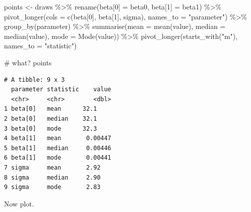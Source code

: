 \documentclass[
  letterpaper,
  DIV=11,
  numbers=noendperiod]{scrartcl}
\newenvironment{Shaded}{\begin{snugshade}}{\end{snugshade}}
\newcommand{\AttributeTok}[1]{\textcolor[rgb]{0.40,0.45,0.13}{#1}}
\newcommand{\CommentTok}[1]{\textcolor[rgb]{0.37,0.37,0.37}{#1}}
\newcommand{\FunctionTok}[1]{\textcolor[rgb]{0.28,0.35,0.67}{#1}}
\newcommand{\NormalTok}[1]{\textcolor[rgb]{0.00,0.23,0.31}{#1}}
\newcommand{\OtherTok}[1]{\textcolor[rgb]{0.00,0.23,0.31}{#1}}
\newcommand{\SpecialCharTok}[1]{\textcolor[rgb]{0.37,0.37,0.37}{#1}}
\newcommand{\StringTok}[1]{\textcolor[rgb]{0.13,0.47,0.30}{#1}}
\begin{document}
\begin{Shaded}
\begin{Highlighting}[]
\NormalTok{points }\OtherTok{\textless{}{-}}\NormalTok{ draws }\SpecialCharTok{\%\textgreater{}\%} 
  \FunctionTok{rename}\NormalTok{(}\StringTok{\textasciigrave{}}\AttributeTok{beta[0]}\StringTok{\textasciigrave{}} \OtherTok{=}\NormalTok{ beta0,}
         \StringTok{\textasciigrave{}}\AttributeTok{beta[1]}\StringTok{\textasciigrave{}} \OtherTok{=}\NormalTok{ beta1) }\SpecialCharTok{\%\textgreater{}\%} 
  \FunctionTok{pivot\_longer}\NormalTok{(}\AttributeTok{cols =} \FunctionTok{c}\NormalTok{(}\StringTok{\textasciigrave{}}\AttributeTok{beta[0]}\StringTok{\textasciigrave{}}\NormalTok{, }\StringTok{\textasciigrave{}}\AttributeTok{beta[1]}\StringTok{\textasciigrave{}}\NormalTok{, sigma), }
               \AttributeTok{names\_to =} \StringTok{"parameter"}\NormalTok{) }\SpecialCharTok{\%\textgreater{}\%} 
  \FunctionTok{group\_by}\NormalTok{(parameter) }\SpecialCharTok{\%\textgreater{}\%} 
  \FunctionTok{summarise}\NormalTok{(}\AttributeTok{mean =} \FunctionTok{mean}\NormalTok{(value),}
            \AttributeTok{median =} \FunctionTok{median}\NormalTok{(value),}
            \AttributeTok{mode =} \FunctionTok{Mode}\NormalTok{(value)) }\SpecialCharTok{\%\textgreater{}\%} 
  \FunctionTok{pivot\_longer}\NormalTok{(}\FunctionTok{starts\_with}\NormalTok{(}\StringTok{"m"}\NormalTok{), }\AttributeTok{names\_to =} \StringTok{"statistic"}\NormalTok{)}

\CommentTok{\# what?}
\NormalTok{points}
\end{Highlighting}
\end{Shaded}

\begin{verbatim}
# A tibble: 9 x 3
  parameter statistic    value
  <chr>     <chr>        <dbl>
1 beta[0]   mean      32.1    
2 beta[0]   median    32.1    
3 beta[0]   mode      32.3    
4 beta[1]   mean       0.00447
5 beta[1]   median     0.00446
6 beta[1]   mode       0.00441
7 sigma     mean       2.92   
8 sigma     median     2.90   
9 sigma     mode       2.83   
\end{verbatim}

Now plot.
\end{document}
